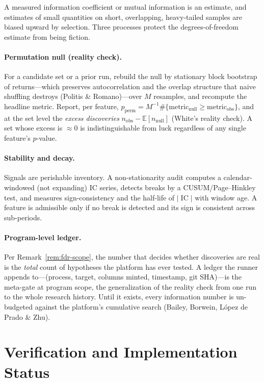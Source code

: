 \documentclass[11pt,a4paper]{article}
\theoremstyle{definition}
\theoremstyle{plain}
\newcommand{\E}{\mathbb{E}}
\DeclareMathOperator{\IC}{IC}
\begin{document}
A measured information coefficient or mutual information is an estimate, and estimates of small
quantities on short, overlapping, heavy-tailed samples are biased upward by selection. Three
processes protect the degrees-of-freedom estimate from being fiction.

\paragraph{Permutation null (reality check).} For a candidate set or a prior run, rebuild the null
by stationary block bootstrap of returns---which preserves autocorrelation and the overlap structure
that naive shuffling destroys (Politis \& Romano)---over $M$ resamples, and recompute the headline
metric. Report, per feature, $p_{\text{perm}}=M^{-1}\#\{\text{metric}_{\text{null}}\ge
\text{metric}_{\text{obs}}\}$, and at the set level the \emph{excess discoveries}
$n_{\text{obs}}-\E[n_{\text{null}}]$ (White's reality check). A set whose excess is $\approx 0$ is
indistinguishable from luck regardless of any single feature's $p$-value.

\paragraph{Stability and decay.} Signals are perishable inventory. A non-stationarity audit computes
a calendar-windowed (not expanding) IC series, detects breaks by a CUSUM/Page--Hinkley test, and
measures sign-consistency and the half-life of $|\IC|$ with window age. A feature is admissible only
if no break is detected and its sign is consistent across sub-periods.

\paragraph{Program-level ledger.} Per Remark~\ref{rem:fdr-scope}, the number that decides whether
discoveries are real is the \emph{total} count of hypotheses the platform has ever tested. A ledger
the runner appends to---(process, target, columns minted, timestamp, git SHA)---is the meta-gate at
program scope, the generalization of the reality check from one run to the whole research history.
Until it exists, every information number is un-budgeted against the platform's cumulative search
(Bailey, Borwein, L\'opez de Prado \& Zhu).

\section{Verification and Implementation Status}
\label{sec:status}
\end{document}
